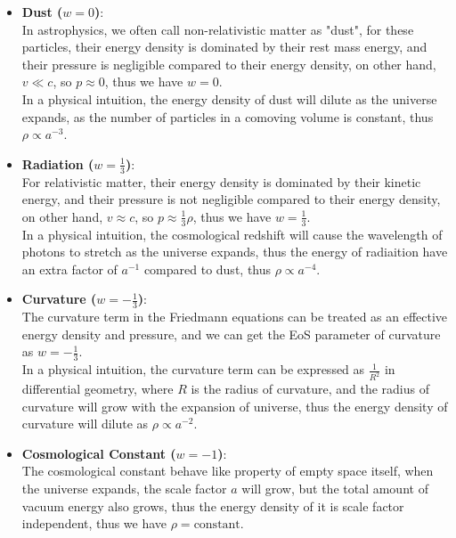 \clearpage
\begin{intuition}
    \begin{itemize}
        \item \textbf{Dust ($w=0$)}: \\
            In astrophysics, we often call non-relativistic matter as "dust", for these particles, their energy density is dominated by their rest mass energy, and their pressure is negligible compared to their energy density, on other hand, $v \ll c$, so $p \approx 0$, thus we have $w = 0$. \\
            
            In a physical intuition, the energy density of dust will dilute as the universe expands, as the number of particles in a comoving volume is constant, thus $\rho \propto a^{-3}$. \\
        \item \textbf{Radiation ($w=\frac{1}{3}$)}: \\
            For relativistic matter, their energy density is dominated by their kinetic energy, and their pressure is not negligible compared to their energy density, on other hand, $v \approx c$, so $p \approx \frac{1}{3}\rho$, thus we have $w = \frac{1}{3}$. \\

            In a physical intuition, the cosmological redshift will cause the wavelength of photons to stretch as the universe expands, thus the energy of radiaition have an extra factor of $a^{-1}$ compared to dust, thus $\rho \propto a^{-4}$. \\
        \item \textbf{Curvature ($w=-\frac{1}{3}$)}: \\
            The curvature term in the Friedmann equations can be treated as an effective energy density and pressure, and we can get the EoS parameter of curvature as $w = -\frac{1}{3}$. \\

            In a physical intuition, the curvature term can be expressed as $\frac{1}{R^2}$ in differential geometry, where $R$ is the radius of curvature, and the radius of curvature will grow with the expansion of universe, thus the energy density of curvature will dilute as $\rho \propto a^{-2}$. \\
        \item \textbf{Cosmological Constant ($w=-1$)}: \\
            The cosmological constant behave like property of empty space itself, when the universe expands, the scale factor $a$ will grow, but the total amount of vacuum energy also grows, thus the energy density of it is scale factor independent, thus we have $\rho = \text{constant}$.
    \end{itemize}
\end{intuition}

